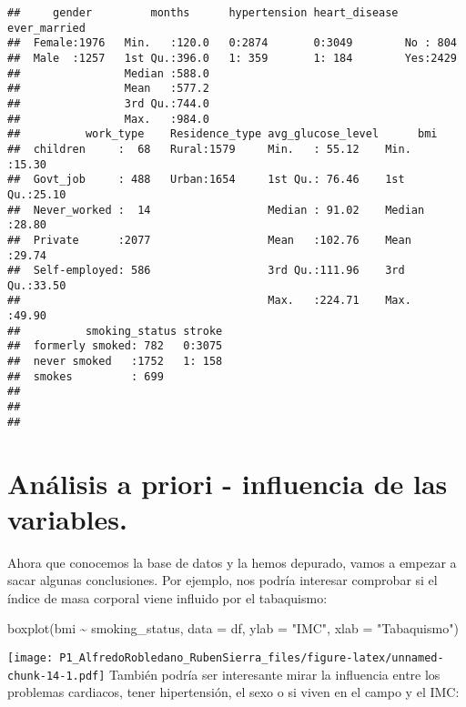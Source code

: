 \documentclass[
]{article}
\newenvironment{Shaded}{\begin{snugshade}}{\end{snugshade}}
\newcommand{\AttributeTok}[1]{\textcolor[rgb]{0.77,0.63,0.00}{#1}}
\newcommand{\FunctionTok}[1]{\textcolor[rgb]{0.00,0.00,0.00}{#1}}
\newcommand{\NormalTok}[1]{#1}
\newcommand{\SpecialCharTok}[1]{\textcolor[rgb]{0.00,0.00,0.00}{#1}}
\newcommand{\StringTok}[1]{\textcolor[rgb]{0.31,0.60,0.02}{#1}}
\begin{document}
\begin{verbatim}
##     gender         months      hypertension heart_disease ever_married
##  Female:1976   Min.   :120.0   0:2874       0:3049        No : 804    
##  Male  :1257   1st Qu.:396.0   1: 359       1: 184        Yes:2429    
##                Median :588.0                                          
##                Mean   :577.2                                          
##                3rd Qu.:744.0                                          
##                Max.   :984.0                                          
##          work_type    Residence_type avg_glucose_level      bmi       
##  children     :  68   Rural:1579     Min.   : 55.12    Min.   :15.30  
##  Govt_job     : 488   Urban:1654     1st Qu.: 76.46    1st Qu.:25.10  
##  Never_worked :  14                  Median : 91.02    Median :28.80  
##  Private      :2077                  Mean   :102.76    Mean   :29.74  
##  Self-employed: 586                  3rd Qu.:111.96    3rd Qu.:33.50  
##                                      Max.   :224.71    Max.   :49.90  
##          smoking_status stroke  
##  formerly smoked: 782   0:3075  
##  never smoked   :1752   1: 158  
##  smokes         : 699           
##                                 
##                                 
## 
\end{verbatim}

\hypertarget{anuxe1lisis-a-priori---influencia-de-las-variables.}{%
\section{Análisis a priori - influencia de las
variables.}\label{anuxe1lisis-a-priori---influencia-de-las-variables.}}

Ahora que conocemos la base de datos y la hemos depurado, vamos a
empezar a sacar algunas conclusiones. Por ejemplo, nos podría interesar
comprobar si el índice de masa corporal viene influido por el
tabaquismo:

\begin{Shaded}
\begin{Highlighting}[]
\FunctionTok{boxplot}\NormalTok{(bmi }\SpecialCharTok{\textasciitilde{}}\NormalTok{ smoking\_status, }\AttributeTok{data =}\NormalTok{ df, }\AttributeTok{ylab =} \StringTok{"IMC"}\NormalTok{, }\AttributeTok{xlab =} \StringTok{"Tabaquismo"}\NormalTok{)}
\end{Highlighting}
\end{Shaded}

\texttt{[image: P1\_AlfredoRobledano\_RubenSierra\_files/figure-latex/unnamed-chunk-14-1.pdf]}
También podría ser interesante mirar la influencia entre los problemas
cardiacos, tener hipertensión, el sexo o si viven en el campo y el IMC:
\end{document}
